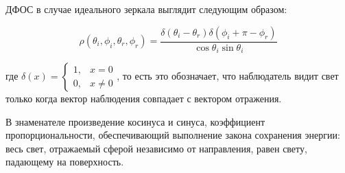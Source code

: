 ДФОС в случае идеального зеркала выглядит следующим образом:

\begin{equation}
  \rho(\theta_i,\phi_i,\theta_r,\phi_r)=\frac{\delta(\theta_i-\theta_r)\delta(\phi_i+\pi-\phi_r)}{\cos\theta_i\sin\theta_i}
\end{equation}

где $\delta(x)=\begin{cases}
    1, & x=0    \\
    0, & x\neq0
  \end{cases}$, то есть это обозначает, что наблюдатель видит свет только когда вектор наблюдения совпадает с вектором отражения.

В знаменателе произведение косинуса и синуса, коэффициент пропорциональности, обеспечивающий выполнение закона сохранения энергии: весь свет, отражаемый сферой независимо от направления, равен свету, падающему на поверхность.
